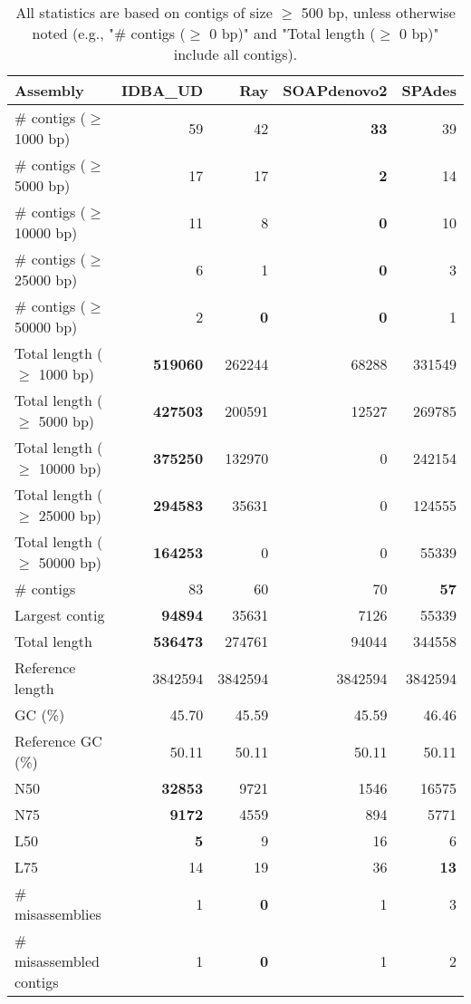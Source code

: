\documentclass[12pt,a4paper]{article}
\begin{document}
\begin{table}[ht]
\begin{center}
\caption{All statistics are based on contigs of size $\geq$ 500 bp, unless otherwise noted (e.g., "\# contigs ($\geq$ 0 bp)" and "Total length ($\geq$ 0 bp)" include all contigs).}
\begin{tabular}{|l*{4}{|r}|}
\hline
Assembly & IDBA\_UD & Ray & SOAPdenovo2 & SPAdes \\ \hline
\# contigs ($\geq$ 1000 bp) & 59 & 42 & {\bf 33} & 39 \\ \hline
\# contigs ($\geq$ 5000 bp) & 17 & 17 & {\bf 2} & 14 \\ \hline
\# contigs ($\geq$ 10000 bp) & 11 & 8 & {\bf 0} & 10 \\ \hline
\# contigs ($\geq$ 25000 bp) & 6 & 1 & {\bf 0} & 3 \\ \hline
\# contigs ($\geq$ 50000 bp) & 2 & {\bf 0} & {\bf 0} & 1 \\ \hline
Total length ($\geq$ 1000 bp) & {\bf 519060} & 262244 & 68288 & 331549 \\ \hline
Total length ($\geq$ 5000 bp) & {\bf 427503} & 200591 & 12527 & 269785 \\ \hline
Total length ($\geq$ 10000 bp) & {\bf 375250} & 132970 & 0 & 242154 \\ \hline
Total length ($\geq$ 25000 bp) & {\bf 294583} & 35631 & 0 & 124555 \\ \hline
Total length ($\geq$ 50000 bp) & {\bf 164253} & 0 & 0 & 55339 \\ \hline
\# contigs & 83 & 60 & 70 & {\bf 57} \\ \hline
Largest contig & {\bf 94894} & 35631 & 7126 & 55339 \\ \hline
Total length & {\bf 536473} & 274761 & 94044 & 344558 \\ \hline
Reference length & 3842594 & 3842594 & 3842594 & 3842594 \\ \hline
GC (\%) & 45.70 & 45.59 & 45.59 & 46.46 \\ \hline
Reference GC (\%) & 50.11 & 50.11 & 50.11 & 50.11 \\ \hline
N50 & {\bf 32853} & 9721 & 1546 & 16575 \\ \hline
N75 & {\bf 9172} & 4559 & 894 & 5771 \\ \hline
L50 & {\bf 5} & 9 & 16 & 6 \\ \hline
L75 & 14 & 19 & 36 & {\bf 13} \\ \hline
\# misassemblies & 1 & {\bf 0} & 1 & 3 \\ \hline
\# misassembled contigs & 1 & {\bf 0} & 1 & 2 \\ \hline

\end{tabular}
\end{center}
\end{table}
\end{document}
